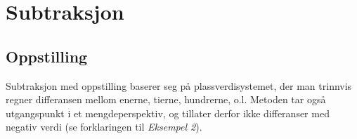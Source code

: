 \section{Subtraksjon}
\subsection{Oppstilling}
Subtraksjon med oppstilling baserer seg på plassverdisystemet, der man trinnvis regner differansen mellom enerne, tierne, hundrerne, o.l. Metoden tar også utgangspunkt i et mengdeperspektiv, og tillater derfor ikke differanser med negativ verdi (se forklaringen til \textsl{Eksempel 2}).
\begin{center}
	\parbox{0.3\linewidth}{
} \qquad
\parbox{0.3\linewidth}{
} \\[12pt]
\parbox{0.3\linewidth}{
}\qquad
\parbox{0.3\linewidth}{
}

\end{center}

